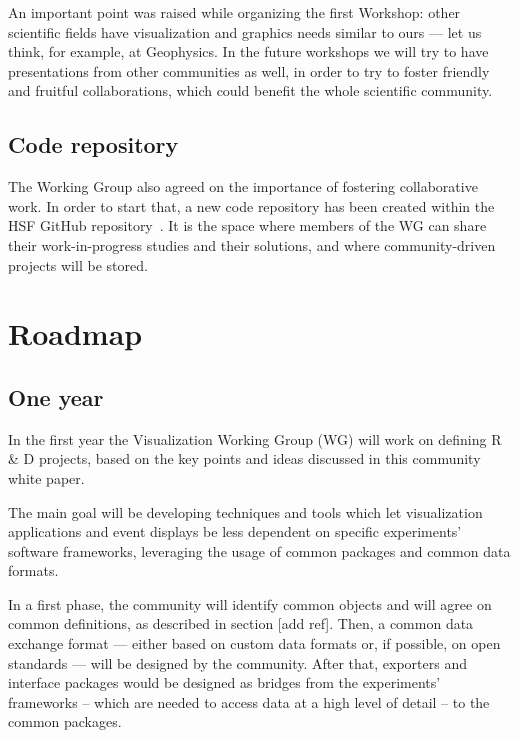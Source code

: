 \documentclass[12pt,a4paper]{article}
\begin{document}
An important point was raised while organizing the first Workshop: other scientific fields have visualization and
graphics needs similar to ours --- let us think, for example, at Geophysics. In the future workshops we will try to
have presentations from other communities as well, in order to try to foster friendly and fruitful collaborations,
which could benefit the whole scientific community.

\hypertarget{repo}{%
\subsection{Code repository}\label{repo}}

The Working Group also agreed on the importance of fostering collaborative work.
In order to start that, a new code repository has been created within the HSF GitHub repository~\cite{HSFVizRepo}.
It is the space where members of the WG can share their work-in-progress studies and their solutions, and where
community-driven projects will be stored.

\hypertarget{roadmap}{%
\section{Roadmap}\label{roadmap}}

\hypertarget{one-year}{%
\subsection{One year}\label{one-year}}

In the first year the Visualization Working Group (WG) will work on defining R \& D projects, based on the key
points and ideas discussed in this community white paper.

The main goal will be developing techniques and tools which let visualization applications and event displays be
less dependent on specific experiments’ software frameworks, leveraging the usage of common packages and common data formats.

In a first phase, the community will identify common objects and will agree on common definitions, as described in
section [add ref]. Then, a common data exchange format --- either based on custom data formats or, if possible, on
open standards --- will be designed by the community. After that, exporters and interface packages would be designed
as bridges from the experiments’ frameworks -- which are needed to access data at a high level of detail -- to the common packages.
\end{document}

